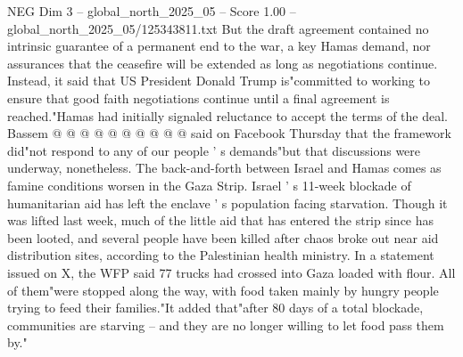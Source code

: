 \begin{textsample}{NEG Dim 3 – global\_north\_2025\_05 – Score 1.00 – global\_north\_2025\_05/125343811.txt}
But the draft agreement contained no intrinsic guarantee of a permanent end to the war, a key Hamas demand, nor assurances that the ceasefire will be extended as long as negotiations continue.
Instead, it said that US President Donald Trump is"committed to working to ensure that good faith negotiations continue until a final agreement is reached."Hamas had initially signaled reluctance to accept the terms of the deal.
Bassem @ @ @ @ @ @ @ @ @ @ said on Facebook Thursday that the framework did"not respond to any of our people ' s demands"but that discussions were underway, nonetheless.
The back-and-forth between Israel and Hamas comes as famine conditions worsen in the Gaza Strip.
Israel ' s 11-week blockade of humanitarian aid has left the enclave ' s population facing starvation.
Though it was lifted last week, much of the little aid that has entered the strip since has been looted, and several people have been killed after chaos broke out near aid distribution sites, according to the Palestinian health ministry.
In a statement issued on X, the WFP said 77 trucks had crossed into Gaza loaded with flour.
All of them"were stopped along the way, with food taken mainly by hungry people trying to feed their families."It added that"after 80 days of a total blockade, communities are starving -- and they are no longer willing to let food pass them by."

\end{textsample}
